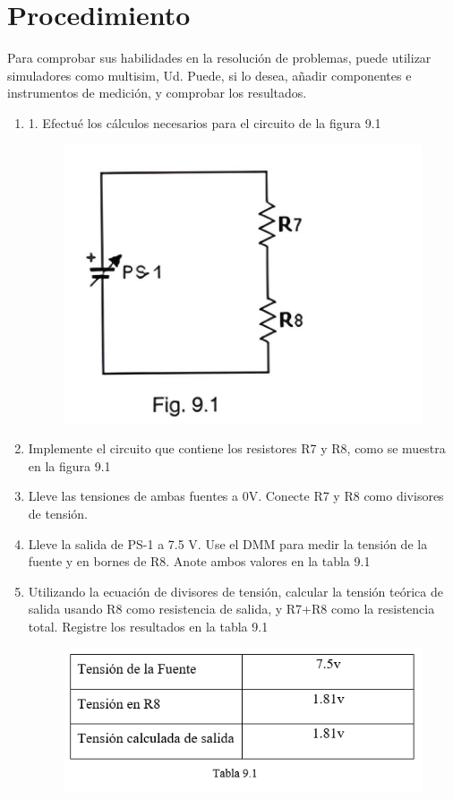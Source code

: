 \section{Procedimiento}
Para comprobar sus habilidades en la resolución de problemas, puede utilizar
simuladores como multisim, Ud. Puede, si lo desea, añadir componentes e
instrumentos de medición, y comprobar los resultados.
\begin{enumerate}
	\item 1.	Efectué los cálculos necesarios para el circuito de la figura 9.1
	\begin{figure}[h]
		\centering
		\includegraphics[scale=0.2]{imagenes/1}
	\end{figure}
	\item	Implemente el circuito que contiene los resistores R7 y R8, como se muestra en la figura 9.1
	\item 	Lleve las tensiones de ambas fuentes a 0V. Conecte R7 y R8 como divisores de tensión.
	\item Lleve la salida de PS-1 a 7.5 V. Use el DMM para medir la tensión de la fuente y en bornes de R8. Anote ambos valores en la tabla 9.1
	\item Utilizando la ecuación de divisores de tensión, calcular la tensión teórica de salida usando R8 como resistencia de salida, y R7+R8 como la resistencia total. Registre los resultados en la tabla 9.1
	\begin{figure}[h]
		\centering 
		\includegraphics[scale=1.2]{imagenes/2}

\end{figure}
\end{enumerate}
